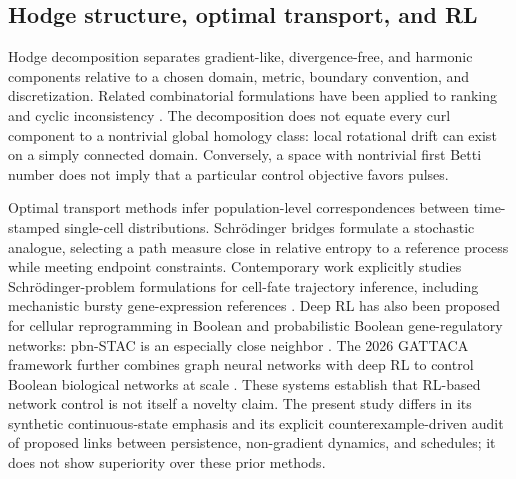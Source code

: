 \documentclass[11pt]{article}
\newcommand{\1}{\mathbf{1}}
\begin{document}
\subsection{Hodge structure, optimal transport, and RL}
Hodge decomposition separates gradient-like, divergence-free, and harmonic components relative to a chosen domain, metric, boundary convention, and discretization. Related combinatorial formulations have been applied to ranking and cyclic inconsistency \citep{jiang2011hodge}. The decomposition does not equate every curl component to a nontrivial global homology class: local rotational drift can exist on a simply connected domain. Conversely, a space with nontrivial first Betti number does not imply that a particular control objective favors pulses.

Optimal transport methods infer population-level correspondences between time-stamped single-cell distributions. Schrödinger bridges formulate a stochastic analogue, selecting a path measure close in relative entropy to a reference process while meeting endpoint constraints. Contemporary work explicitly studies Schrödinger-problem formulations for cell-fate trajectory inference, including mechanistic bursty gene-expression references \citep{fournie2026schrodinger,deciphering2025cellfate}. Deep RL has also been proposed for cellular reprogramming in Boolean and probabilistic Boolean gene-regulatory networks: pbn-STAC is an especially close neighbor \citep{zarzycki2025pbnstac}. The 2026 GATTACA framework further combines graph neural networks with deep RL to control Boolean biological networks at scale \citep{mizera2026gattaca}. These systems establish that RL-based network control is not itself a novelty claim. The present study differs in its synthetic continuous-state emphasis and its explicit counterexample-driven audit of proposed links between persistence, non-gradient dynamics, and schedules; it does not show superiority over these prior methods.
\end{document}
